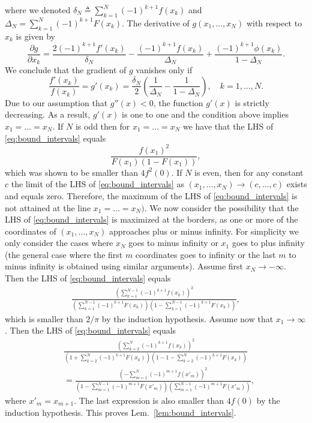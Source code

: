\documentclass[letterpaper, conference]{IEEEtran}      %
\begin{document}
where we denoted $\delta_N \triangleq \sum_{k=1}^{N} (-1)^{k+1} f(x_k)$ and $\Delta_N =  \sum_{k=1}^N (-1)^{k+1} F(x_k)$. The derivative of $g(x_1,\ldots,x_N)$ with respect to $x_k$ is given by
\[
\frac{\partial  g}{\partial x_k} = \frac{2 (-1)^{k+1} f'(x_k)}{\delta_N} -\frac{(-1)^{k+1} f(x_k)}{\Delta_N } + \frac{(-1)^{k+1} \phi(x_k)}{1-\Delta_N }.
\]
We conclude that the gradient of $g$ vanishes only if
\[
\frac{f'(x_k)}{f(x_k)} = g'(x_k) = \frac{\delta_N}{2} \left( \frac{1}{\Delta_N} - \frac{1}{1-\Delta_N} \right),\quad k=1,\ldots,N.
\]
Due to our assumption that $g''(x) < 0$, the function $g'(x)$ is strictly decreasing. As a result, $g'(x)$ is one to one and the condition above implies $x_1 = \ldots = x_N$. If $N$ is odd then for $x_1=\ldots =x_N$ we have that the LHS of \eqref{eq:bound_intervals} equals
\[
\frac{f(x_1)^2}{ F(x_1) (1 - F(x_1))},
\]
which was shown to be smaller than $4f^2(0)$. If $N$ is even, then for any constant $c$ the limit of the LHS of \eqref{eq:bound_intervals} as $(x_1,\ldots,x_N)\rightarrow (c,\ldots,c)$ exists and equals zero. Therefore, the maximum of the LHS of \eqref{eq:bound_intervals} is not attained at the line $x_1=\ldots=x_N)$. We now consider the possibility that the LHS of \eqref{eq:bound_intervals} is maximized at the borders, as one or more of the coordinates of $(x_1,\ldots,x_N)$ approaches plus or minus infinity. For simplicity we only consider the cases where $x_N$ goes to minus infinity or $x_1$ goes to plus infinity (the general case where the first $m$ coordinates goes to infinity or the last $m$ to minus infinity is obtained using similar arguments). Assume first $x_N \rightarrow -\infty$. Then the LHS of \eqref{eq:bound_intervals} equals
\begin{align*}
\frac{ \left(  \sum_{k=1}^{N-1} (-1)^{k+1}f(x_k) \right)^2} 
{\left( \sum_{k=1}^{N-1} (-1)^{k+1} F(x_k) \right)\left(1- \sum_{k=1}^{N-1} (-1)^{k+1} F(x_k)  \right) } ,
\end{align*}
which is smaller than $2/\pi$ by the induction hypothesis. Assume now that $x_1 \rightarrow \infty$. Then the LHS of
\eqref{eq:bound_intervals} equals
\begin{align*}
& \frac{ \left(  \sum_{k=2}^{N} (-1)^{k+1}f(x_k) \right)^2} 
{\left( 1 + \sum_{k=2}^{N} (-1)^{k+1} F(x_k) \right)\left(1- 1 - \sum_{k=2}^{N} (-1)^{k+1} F(x_k)  \right) }  \\
& = \frac{ \left(  -\sum_{m=1}^{N} (-1)^{m+1}f(x'_m) \right)^2} 
{\left( 1 - \sum_{m=1}^{N-1} (-1)^{m+1} F(x'_{m}) \right)\left( \sum_{m=1}^{N-1} (-1)^{m+1} F(x'_{m})  \right) },
\end{align*}
where $x'_{m} = x_{m+1}$. The last expression is also smaller than $4f(0)$ by the induction hypothesis. This proves Lem.~\ref{lem:bound_intervals}. \\
\end{document}

